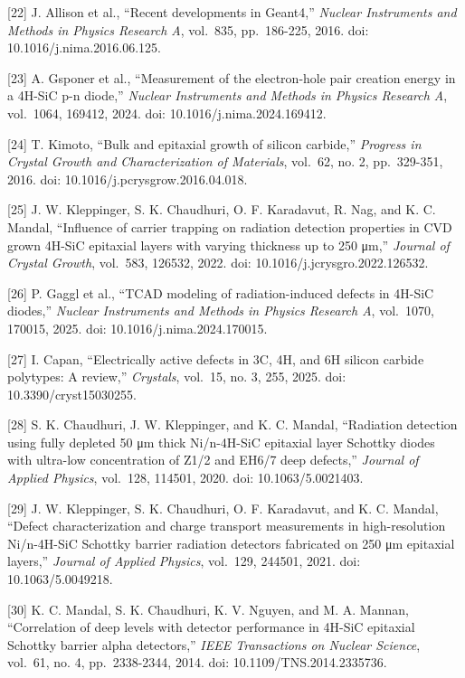 \documentclass[
  10pt,
  a4paper,
]{article}
\begin{document}
{[}22{]} J. Allison et al., ``Recent developments in Geant4,''
\emph{Nuclear Instruments and Methods in Physics Research A}, vol.~835,
pp.~186-225, 2016. doi: 10.1016/j.nima.2016.06.125.

{[}23{]} A. Gsponer et al., ``Measurement of the electron-hole pair
creation energy in a 4H-SiC p-n diode,'' \emph{Nuclear Instruments and
Methods in Physics Research A}, vol.~1064, 169412, 2024. doi:
10.1016/j.nima.2024.169412.

{[}24{]} T. Kimoto, ``Bulk and epitaxial growth of silicon carbide,''
\emph{Progress in Crystal Growth and Characterization of Materials},
vol.~62, no. 2, pp.~329-351, 2016. doi: 10.1016/j.pcrysgrow.2016.04.018.

{[}25{]} J. W. Kleppinger, S. K. Chaudhuri, O. F. Karadavut, R. Nag, and
K. C. Mandal, ``Influence of carrier trapping on radiation detection
properties in CVD grown 4H-SiC epitaxial layers with varying thickness
up to 250 μm,'' \emph{Journal of Crystal Growth}, vol.~583, 126532,
2022. doi: 10.1016/j.jcrysgro.2022.126532.

{[}26{]} P. Gaggl et al., ``TCAD modeling of radiation-induced defects
in 4H-SiC diodes,'' \emph{Nuclear Instruments and Methods in Physics
Research A}, vol.~1070, 170015, 2025. doi: 10.1016/j.nima.2024.170015.

{[}27{]} I. Capan, ``Electrically active defects in 3C, 4H, and 6H
silicon carbide polytypes: A review,'' \emph{Crystals}, vol.~15, no. 3,
255, 2025. doi: 10.3390/cryst15030255.

{[}28{]} S. K. Chaudhuri, J. W. Kleppinger, and K. C. Mandal,
``Radiation detection using fully depleted 50 μm thick Ni/n-4H-SiC
epitaxial layer Schottky diodes with ultra-low concentration of Z1/2 and
EH6/7 deep defects,'' \emph{Journal of Applied Physics}, vol.~128,
114501, 2020. doi: 10.1063/5.0021403.

{[}29{]} J. W. Kleppinger, S. K. Chaudhuri, O. F. Karadavut, and K. C.
Mandal, ``Defect characterization and charge transport measurements in
high-resolution Ni/n-4H-SiC Schottky barrier radiation detectors
fabricated on 250 μm epitaxial layers,'' \emph{Journal of Applied
Physics}, vol.~129, 244501, 2021. doi: 10.1063/5.0049218.

{[}30{]} K. C. Mandal, S. K. Chaudhuri, K. V. Nguyen, and M. A. Mannan,
``Correlation of deep levels with detector performance in 4H-SiC
epitaxial Schottky barrier alpha detectors,'' \emph{IEEE Transactions on
Nuclear Science}, vol.~61, no. 4, pp.~2338-2344, 2014. doi:
10.1109/TNS.2014.2335736.
\end{document}
